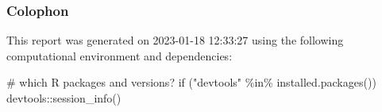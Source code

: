 \documentclass[
  super,
  preprint,
  3p]{elsarticle}
\newenvironment{Shaded}{\begin{snugshade}}{\end{snugshade}}
\newcommand{\CommentTok}[1]{\textcolor[rgb]{0.37,0.37,0.37}{#1}}
\newcommand{\ControlFlowTok}[1]{\textcolor[rgb]{0.00,0.23,0.31}{#1}}
\newcommand{\FunctionTok}[1]{\textcolor[rgb]{0.28,0.35,0.67}{#1}}
\newcommand{\NormalTok}[1]{\textcolor[rgb]{0.00,0.23,0.31}{#1}}
\newcommand{\SpecialCharTok}[1]{\textcolor[rgb]{0.37,0.37,0.37}{#1}}
\newcommand{\StringTok}[1]{\textcolor[rgb]{0.13,0.47,0.30}{#1}}
\begin{document}
\hypertarget{colophon}{%
\subsubsection{Colophon}\label{colophon}}

This report was generated on 2023-01-18 12:33:27 using the following
computational environment and dependencies:

\begin{Shaded}
\begin{Highlighting}[]
\CommentTok{\# which R packages and versions?}
\ControlFlowTok{if}\NormalTok{ (}\StringTok{"devtools"} \SpecialCharTok{\%in\%} \FunctionTok{installed.packages}\NormalTok{()) devtools}\SpecialCharTok{::}\FunctionTok{session\_info}\NormalTok{()}
\end{Highlighting}
\end{Shaded}
\end{document}
